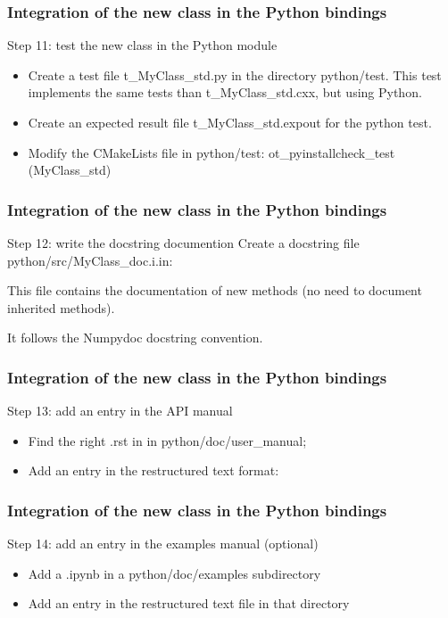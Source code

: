 \documentclass[8pt]{beamer}
\begin{document}
\begin{frame}
  \frametitle{Integration of the new class in the Python bindings}
  \begin{block}{Step 11: test the new class in the Python module}
    \begin{itemize}
    \item Create a test file t\_MyClass\_std.py in the directory python/test. This test implements the same tests than t\_MyClass\_std.cxx, but using Python.
    \item Create an expected result file t\_MyClass\_std.expout for the python test.
    \item Modify the CMakeLists file in python/test:
      {\ttfamily ot\_pyinstallcheck\_test (MyClass\_std)}
    \end{itemize}
  \end{block}
\end{frame}
\begin{frame}[containsverbatim]
  \frametitle{Integration of the new class in the Python bindings}
  \begin{block}{Step 12: write the docstring documention}
    Create a docstring file python/src/MyClass\_doc.i.in:
    
    This file contains the documentation of new methods (no need to document inherited methods).
    
    It follows the Numpydoc docstring convention.
  \end{block}
\end{frame}
\begin{frame}[containsverbatim]
  \frametitle{Integration of the new class in the Python bindings}
  \begin{block}{Step 13: add an entry in the API manual}
    
    \begin{itemize}
    \item Find the right .rst in in python/doc/user\_manual;
    \item Add an entry in the restructured text format:
    \end{itemize}
  \end{block}
\end{frame}
\begin{frame}[containsverbatim]
  \frametitle{Integration of the new class in the Python bindings}
  \begin{block}{Step 14: add an entry in the examples manual (optional)}
    
    \begin{itemize}
    \item Add a .ipynb in a python/doc/examples subdirectory
    \item Add an entry in the restructured text file in that directory 
    \end{itemize}
  \end{block}
\end{frame}
\end{document}
